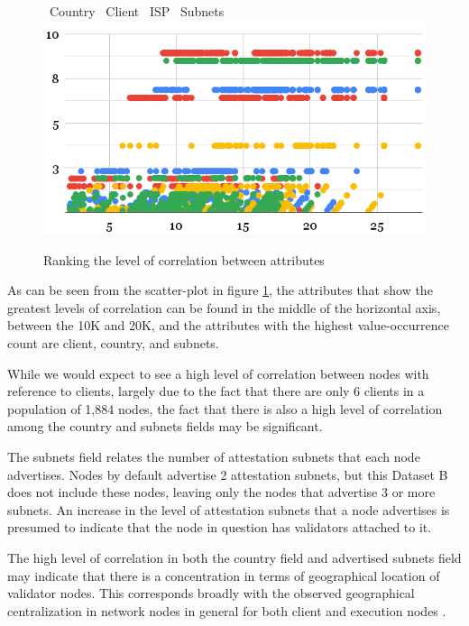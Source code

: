 \documentclass[conference]{IEEEtran}
\begin{document}
\vspace{6pt}

\begin{figure}[htbp]
    \centering
    \LARGE \textcolor{bluebullet}\textbullet\ \normalsize Country %
    \LARGE \textcolor{redbullet}\textbullet\ \normalsize Client %
    \LARGE \textcolor{yellowbullet}\textbullet\ \normalsize ISP %
    \LARGE \textcolor{greenbullet}\textbullet\ \normalsize Subnets
    \includegraphics[width=1\linewidth]{figures/node-correlation-ranking.png}
    \caption{Ranking the level of correlation between attributes}
    \label{fig:attribute-correlation-ranking}
\end{figure}

As can be seen from the scatter-plot in figure \ref{fig:attribute-correlation-ranking}, the attributes that show the greatest levels of correlation can be found in the middle of the horizontal axis, between the 10K and 20K, and the attributes with the highest value-occurrence count are client, country, and subnets.

While we would expect to see a high level of correlation between nodes with reference to clients, largely due to the fact that there are only 6 clients in a population of 1,884 nodes, the fact that there is also a high level of correlation among the country and subnets fields may be significant.

The subnets field relates the number of attestation subnets that each node advertises.  Nodes by default advertise 2 attestation subnets, but this Dataset B does not include these nodes, leaving only the nodes that advertise 3 or more subnets.  An increase in the level of attestation subnets that a node advertises is presumed to indicate that the node in question has validators attached to it.

The high level of correlation in both the country field and advertised subnets field may indicate that there is a concentration in terms of geographical location of validator nodes.  This corresponds broadly with the observed geographical centralization in network nodes in general for both client and execution nodes \cite{nodewatch2024}.
\end{document}

